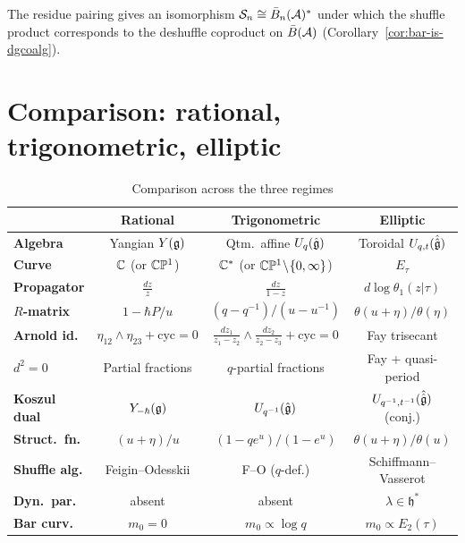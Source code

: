 \begin{remark}\label{rem:shuffle-bar}
The residue pairing gives an isomorphism $\mathcal{S}_n \cong \bar{B}_n(\mathcal{A})^*$ under which the shuffle product corresponds to the deshuffle coproduct on $\bar{B}(\mathcal{A})$ (Corollary~\ref{cor:bar-is-dgcoalg}).
\end{remark}


\section{Comparison: rational, trigonometric, elliptic}
\label{sec:rat-trig-ell-comparison}

\begin{table}[ht]
\centering
\caption{Comparison across the three regimes}
\label{tab:rat-trig-ell}
\renewcommand{\arraystretch}{1.35}
{\footnotesize
\begin{tabular}{|l|c|c|c|}
\hline
& \textbf{Rational} & \textbf{Trigonometric} & \textbf{Elliptic} \\
\hline
\textbf{Algebra}
& Yangian $Y(\mathfrak{g})$
& Qtm.\ affine $U_q(\hat{\mathfrak{g}})$
& Toroidal $U_{q,t}(\hat{\hat{\mathfrak{g}}})$ \\
\hline
\textbf{Curve}
& $\mathbb{C}$ (or $\mathbb{C}\mathbb{P}^1$)
& $\mathbb{C}^*$ (or $\mathbb{C}\mathbb{P}^1 \!\setminus\! \{0,\infty\}$)
& $E_\tau$ \\
\hline
\textbf{Propagator}
& $\frac{dz}{z}$
& $\frac{dz}{1 - z}$
& $d\log\theta_1(z|\tau)$ \\
\hline
\textbf{$R$-matrix}
& $1 - \hbar P/u$
& $(q{-}q^{-1})/(u{-}u^{-1})$
& $\theta(u{+}\eta)/\theta(\eta)$ \\
\hline
\textbf{Arnold id.}
& $\eta_{12}\!\wedge\!\eta_{23} + \text{cyc} = 0$
& $\frac{dz_1}{z_1{-}z_2}\!\wedge\!\frac{dz_2}{z_2{-}z_3} {+} \text{cyc} = 0$
& Fay trisecant \\
\hline
\textbf{$d^2\!=\!0$}
& Partial fractions
& $q$-partial fractions
& Fay + quasi-period \\
\hline
\textbf{Koszul dual}
& $Y_{-\hbar}(\mathfrak{g})$
& $U_{q^{-1}}(\hat{\mathfrak{g}})$
& $U_{q^{-1},t^{-1}}(\hat{\hat{\mathfrak{g}}})$ (conj.) \\
\hline
\textbf{Struct.\ fn.}
& $(u{+}\eta)/u$
& $(1{-}qe^u)/(1{-}e^u)$
& $\theta(u{+}\eta)/\theta(u)$ \\
\hline
\textbf{Shuffle alg.}
& Feigin--Odesskii
& F--O ($q$-def.)
& Schiffmann--Vasserot \\
\hline
\textbf{Dyn.\ par.}
& absent
& absent
& $\lambda \in \mathfrak{h}^*$ \\
\hline
\textbf{Bar curv.}
& $m_0 = 0$
& $m_0 \propto \log q$
& $m_0 \propto E_2(\tau)$ \\
\hline
\end{tabular}
}
\end{table}

